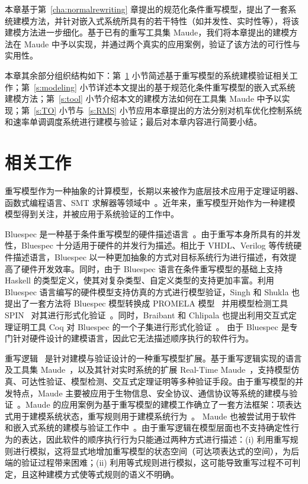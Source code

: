 本章基于第~\ref{cha:normalrewriting} 章提出的规范化条件重写模型，提出了一套系统建模方法，并针对嵌入式系统所具有的若干特性（如并发性、实时性等），将该建模方法进一步细化。基于已有的重写工具集 Maude，我们将本章提出的建模方法在 Maude 中予以实现，并通过两个真实的应用案例，验证了该方法的可行性与实用性。

本章其余部分组织结构如下：第~\ref{s:modeling-related} 小节简述基于重写模型的系统建模验证相关工作；第~\ref{s:modeling} 小节详述本文提出的基于规范化条件重写模型的嵌入式系统建模方法；第~\ref{s:tool} 小节介绍本文的建模方法如何在工具集 Maude 中予以实现；第~\ref{s:TO} 小节与~\ref{s:RMS} 小节应用本章提出的方法分别对机车优化控制系统和速率单调调度系统进行建模与验证；最后对本章内容进行简要小结。 


\section{相关工作}
\label{s:modeling-related} 

重写模型作为一种抽象的计算模型，长期以来被作为底层技术应用于定理证明器、函数式编程语言、SMT 求解器等领域中~\cite{assaf16a,DBLP:conf/lics/JouannaudO91,DBLP:conf/cav/Nadel14}。近年来，重写模型开始作为一种建模模型得到关注，并被应用于系统验证的工作中。

Bluespec 是一种基于条件重写模型的硬件描述语言~\cite{nikhil2008bluespec}。由于重写本身所具有的并发性，Bluespec 十分适用于硬件的并发行为描述。相比于 VHDL、Verilog 等传统硬件描述语言，Bluespec 以一种更加抽象的方式对目标系统行为进行描述，有效提高了硬件开发效率。同时，由于 Bluespec 语言在条件重写模型的基础上支持 Haskell 的类型定义，使其对复杂类型、自定义类型的支持更加丰富。利用 Bluespec 语言编写的硬件模型支持仿真的方式进行模型验证，Singh 和 Shukla 也提出了一套方法将 Bluespec 模型转换成 PROMELA 模型~\cite{DBLP:journals/cn/Holzmann93} 并用模型检测工具 SPIN~\cite{DBLP:journals/tse/Holzmann97} 对其进行形式化验证~\cite{DBLP:conf/mtv/SinghS07}。同时，Braibant 和 Chlipala 也提出利用交互式定理证明工具 Coq 对 Bluespec 的一个子集进行形式化验证~\cite{DBLP:conf/cav/BraibantC13}。 由于 Bluespec 是专门针对硬件设计的建模语言，因此它无法描述顺序执行的软件行为。 

重写逻辑~\cite{DBLP:journals/tcs/Marte-OlietM02,DBLP:journals/jlp/Meseguer12} 是针对建模与验证设计的一种重写模型扩展。基于重写逻辑实现的语言及工具集 Maude~\cite{DBLP:journals/tcs/ClavelDELMMQ02}，以及其针对实时系统的扩展 Real-Time Maude~\cite{DBLP:journals/lisp/OlveczkyM07}，支持模型仿真、可达性验证、模型检测、交互式定理证明等多种验证手段。由于重写模型的并发特点，Maude 主要被应用于生物信息、安全协议、通信协议等系统的建模与验证~\cite{DBLP:journals/jlp/Meseguer12,DBLP:journals/iandc/MeseguerR13}。Maude 的应用案例为基于重写模型的建模工作确立了一套方法框架：项表达式用于建模系统状态，重写规则用于建模系统行为~\cite{DBLP:conf/maude/2007}。 Maude 也被尝试用于软件和嵌入式系统的建模与验证工作中~\cite{DBLP:journals/scp/BaeKMO15}。由于重写逻辑在模型层面也不支持确定性行为的表达，因此软件的顺序执行行为只能通过两种方式进行描述：(i) 利用重写规则进行模拟，这将显式地增加重写模型的状态空间（可达项表达式的空间），为后端的验证过程带来困难；(ii) 利用等式规则进行模拟，这可能导致重写过程不可判定，且这种建模方式使等式规则的语义不明确。


